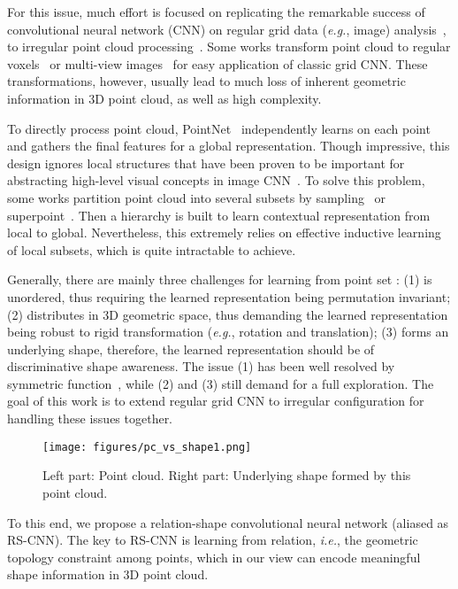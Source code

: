 \documentclass[10pt,twocolumn,letterpaper]{article}
\begin{document}
For this issue, much effort is focused on replicating the remarkable success of convolutional neural network (CNN) on regular grid data (\textit{e.g.}, image) analysis~\cite{alexnet, VGG}, to irregular point cloud processing~\cite{c2_pointnet2,c23,c21,c5_generalcnn,c6_synccnn,c10_splatnet,c14_scn}.
Some works transform point cloud to regular voxels~\cite{modelnet40,vox2,c45} or multi-view images~\cite{multiview1,c37,multiview2} for easy application of classic grid CNN.
These transformations, however, usually lead to much loss of inherent geometric information in 3D point cloud, as well as high complexity.


To directly process point cloud, PointNet~\cite{c1_pointnet} independently learns on each point and gathers the final features for a global representation.
Though impressive, this design ignores local structures that have been proven to be important for abstracting high-level visual concepts in image CNN~\cite{visualize}.
To solve this problem, some works partition point cloud into several subsets by sampling~\cite{c2_pointnet2} or superpoint~\cite{c8_superpoint}.
Then a hierarchy is built to learn contextual representation from local to global.
Nevertheless, this extremely relies on effective inductive learning of local subsets, which is quite intractable to achieve.


Generally, there are mainly three challenges for learning from point set :
(1)  is unordered, thus requiring the learned representation being permutation invariant;
(2)  distributes in 3D geometric space, thus demanding the learned representation being robust to rigid transformation (\textit{e.g.}, rotation and translation);
(3)  forms an underlying shape, therefore, the learned representation should be of discriminative shape awareness.
The issue (1) has been well resolved by symmetric function~\cite{c1_pointnet,c6_synccnn,c24}, while (2) and (3) still demand for a full exploration.
The goal of this work is to extend regular grid CNN to irregular configuration for handling these issues together.


\begin{figure}[t]
\centerline{\texttt{[image: figures/pc\_vs\_shape1.png]}}
\caption{Left part: Point cloud. Right part: Underlying shape formed by this point cloud.}
\label{fig1:pc_vs_shape}
\end{figure}

To this end, we propose a relation-shape convolutional neural network (aliased as RS-CNN).
The key to RS-CNN is learning from relation, \textit{i.e.}, the geometric topology constraint among points, which in our view can encode meaningful shape information in 3D point cloud.
\end{document}

